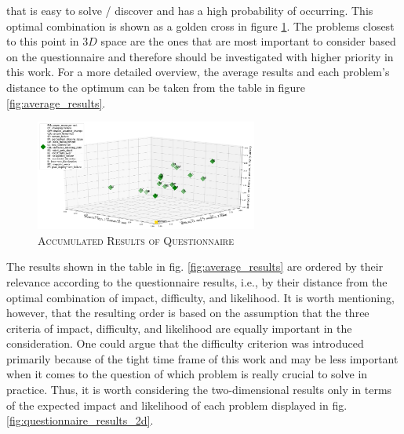 \documentclass[english, master, utf8]{base/thesis_KBS}
\begin{document}
that is easy to solve / discover and has a high probability of occurring. This optimal combination is shown as a golden cross in figure \ref{fig:questionnaire_results}.
The problems closest to this point in $3D$ space are the ones that are most important to consider based on the questionnaire and therefore should be 
investigated with higher priority in this work. For a more detailed overview, the average results and each problem's distance to the optimum can be taken from the table 
in figure \ref{fig:average_results}.
\begin{figure}[H]
    \centering
    \includegraphics[width=0.65\textwidth]{pics/questionnaire.png}
    \caption{\textsc{Accumulated Results of Questionnaire}}
    \label{fig:questionnaire_results}
\end{figure}
\noindent
The results shown in the table in fig. \ref{fig:average_results} are ordered by their relevance according to the questionnaire results, i.e.,
by their distance from the optimal combination of impact, difficulty, and likelihood. It is worth mentioning, however, that the resulting order is based on the assumption
that the three criteria of impact, difficulty, and likelihood are equally important in the consideration. One could argue that the difficulty criterion was introduced 
primarily because of the tight time frame of this work and may be less important when it comes to the question of which problem is really crucial to solve in practice.
Thus, it is worth considering the two-dimensional results only in terms of the expected impact and likelihood of each problem displayed in fig. \ref{fig:questionnaire_results_2d}.
\end{document}
